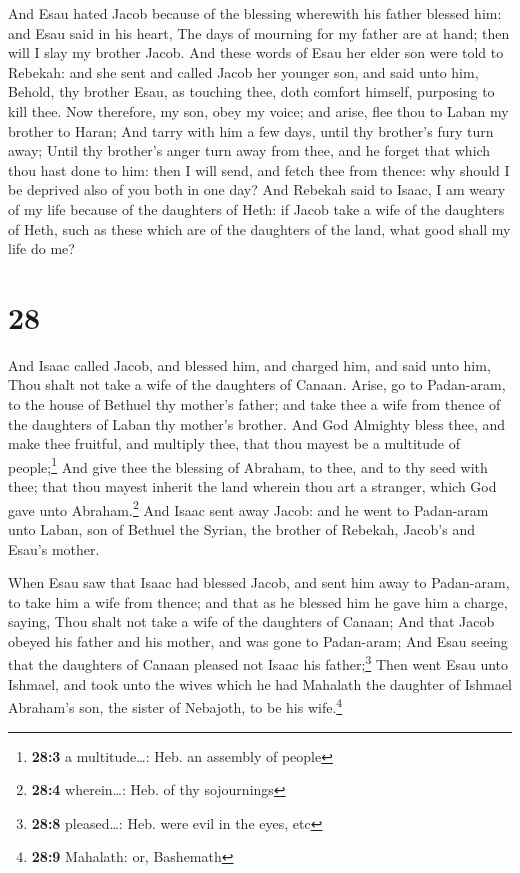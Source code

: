  And Esau hated Jacob because of the blessing wherewith
his father blessed him: and Esau said in his heart, The days of mourning
for my father are at hand; then will I slay my brother Jacob.
 And these words of Esau her elder son were told to
Rebekah: and she sent and called Jacob her younger son, and said unto
him, Behold, thy brother Esau, as touching thee, doth comfort himself,
purposing to kill thee.  Now therefore, my son, obey my
voice; and arise, flee thou to Laban my brother to Haran;
 And tarry with him a few days, until thy brother's fury
turn away;  Until thy brother's anger turn away from
thee, and he forget that which thou hast done to him: then I will send,
and fetch thee from thence: why should I be deprived also of you both in
one day?  And Rebekah said to Isaac, I am weary of my
life because of the daughters of Heth: if Jacob take a wife of the
daughters of Heth, such as these which are of the daughters of the land,
what good shall my life do me?

\hypertarget{section-27}{%
\section{28}\label{section-27}}

 And Isaac called Jacob, and blessed him, and charged him,
and said unto him, Thou shalt not take a wife of the daughters of
Canaan.  Arise, go to Padan-aram, to the house of Bethuel
thy mother's father; and take thee a wife from thence of the daughters
of Laban thy mother's brother.  And God Almighty bless
thee, and make thee fruitful, and multiply thee, that thou mayest be a
multitude of people;\footnote{\textbf{28:3} a multitude\ldots: Heb. an
  assembly of people}  And give thee the blessing of
Abraham, to thee, and to thy seed with thee; that thou mayest inherit
the land wherein thou art a stranger, which God gave unto
Abraham.\footnote{\textbf{28:4} wherein\ldots: Heb. of thy sojournings}
 And Isaac sent away Jacob: and he went to Padan-aram unto
Laban, son of Bethuel the Syrian, the brother of Rebekah, Jacob's and
Esau's mother.

 When Esau saw that Isaac had blessed Jacob, and sent him
away to Padan-aram, to take him a wife from thence; and that as he
blessed him he gave him a charge, saying, Thou shalt not take a wife of
the daughters of Canaan;  And that Jacob obeyed his father
and his mother, and was gone to Padan-aram;  And Esau
seeing that the daughters of Canaan pleased not Isaac his
father;\footnote{\textbf{28:8} pleased\ldots: Heb. were evil in the
  eyes, etc}  Then went Esau unto Ishmael, and took unto
the wives which he had Mahalath the daughter of Ishmael Abraham's son,
the sister of Nebajoth, to be his wife.\footnote{\textbf{28:9} Mahalath:
  or, Bashemath}

